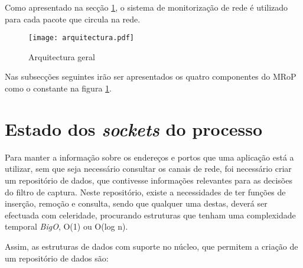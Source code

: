 Como apresentado na secção \ref{}, o sistema de monitorização de rede é utilizado para cada pacote que circula na rede.

\begin{figure}[ht]
\centering
\texttt{[image: arquitectura.pdf]}
\caption{Arquitectura geral}
\label{fig:general_architecture}
\end{figure}







Nas subsecções seguintes irão ser apresentados os quatro componentes do MRoP como o constante na figura \ref{fig:general_architecture}.


\section{Estado dos \textit{sockets} do processo}

Para manter a informação sobre os endereços e portos que uma aplicação está a utilizar, sem que seja necessário consultar os canais de rede, foi necessário criar um repositório de dados, que contivesse informações relevantes para as decisões do filtro de captura.
Neste repositório, existe a necessidades de ter funções de inserção, remoção e consulta, sendo que qualquer uma destas, deverá ser efectuada com celeridade, procurando estruturas que tenham uma complexidade temporal \textit{BigO}, O(1) ou O(log n).

Assim, as estruturas de dados com suporte no núcleo, que permitem a criação de um repositório de dados são:


